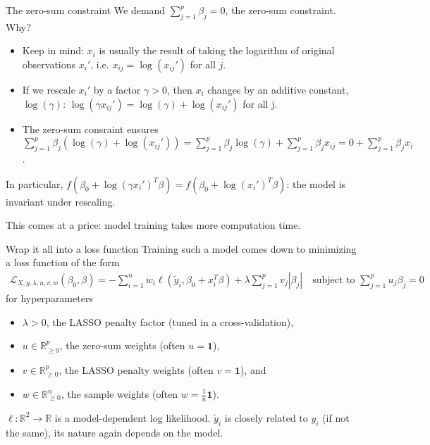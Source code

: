 \documentclass[10pt, aspectratio=169]{beamer}
\def\RR{\mathbb{R}}
\begin{document}
\begin{frame}{The zero-sum constraint}
  We demand $\sum_{j=1}^p \beta_j = 0$, the zero-sum constraint. Why?

  \begin{itemize}
    \item Keep in mind: $x_i$ is usually the result of taking the logarithm of original 
      observations $x_i'$, i.e. $x_{ij} = \log(x_{ij}')$ for all $j$.
    \item If we rescale $x_i'$ by a factor $\gamma > 0$, then $x_i$ changes by an additive 
      constant, $\log(\gamma)$: $\log(\gamma x_{ij}') = \log(\gamma) + \log(x_{ij}')$ for all j.
    \item The zero-sum consraint ensures $\sum_{j=1}^p \beta_j (\log(\gamma) + \log(x_{ij}')) = 
      \sum_{j=1}^p \beta_j \log(\gamma) + \sum_{j=1}^p \beta_j x_{ij} = 0 + \sum_{j=1}^p 
      \beta_j x_i$. 
  \end{itemize}
  
  In particular, $f(\beta_0 + \log(\gamma x_i')^T \beta) = f(\beta_0 + \log(x_i')^T \beta)$: the 
  model is \alert{invariant under rescaling}.

  This comes at a price: model training takes more computation time.
\end{frame}

\begin{frame}{Wrap it all into a loss function}
  Training such a model comes down to minimizing a loss function of the form 
  \begin{align}
    \mathcal{L}_{X, y, \lambda, u, v, w}(\beta_0, \beta) = -\sum_{i=1}^n w_i 
    \ell(\tilde{y}_i, \beta_0 + x_i^T \beta) + \lambda \sum_{j=1}^p v_j |\beta_j| 
    \quad \text{subject to } \sum_{j=1}^p u_j \beta_j = 0
  \end{align}
  for hyperparameters 
  \begin{itemize}
    \item $\lambda > 0$, the LASSO penalty factor (tuned in a cross-validation),
    \item $u \in \RR^p_{\geq 0}$, the zero-sum weights (often $u = \mathbf{1}$),
    \item $v \in \RR^p_{\geq 0}$, the LASSO penalty weights (often $v = \mathbf{1}$), and
    \item $w \in \RR^n_{\geq 0}$, the sample weights (often $w = \frac{1}{n} \mathbf{1}$).
  \end{itemize}

  $\ell: \RR^2 \to \RR$ is a model-dependent log likelihood. $\tilde{y}_i$ is closely 
  related to $y_i$ (if not the same), its nature again depends on the model.
\end{frame}
\end{document}
